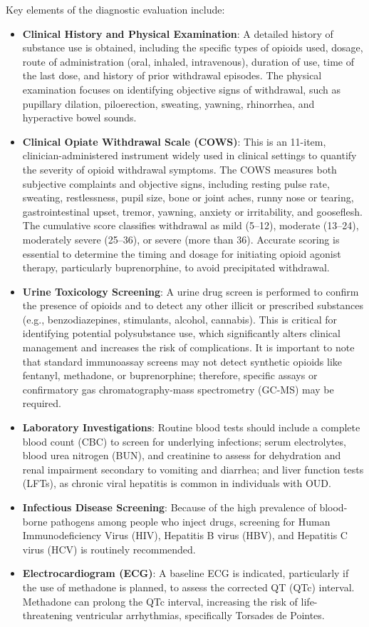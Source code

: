 Key elements of the diagnostic evaluation include:
\begin{itemize}
    \item \textbf{Clinical History and Physical Examination}: A detailed history of substance use is obtained, including the specific types of opioids used, dosage, route of administration (oral, inhaled, intravenous), duration of use, time of the last dose, and history of prior withdrawal episodes. The physical examination focuses on identifying objective signs of withdrawal, such as pupillary dilation, piloerection, sweating, yawning, rhinorrhea, and hyperactive bowel sounds.
    \item \textbf{Clinical Opiate Withdrawal Scale (COWS)}: This is an 11-item, clinician-administered instrument widely used in clinical settings to quantify the severity of opioid withdrawal symptoms. The COWS measures both subjective complaints and objective signs, including resting pulse rate, sweating, restlessness, pupil size, bone or joint aches, runny nose or tearing, gastrointestinal upset, tremor, yawning, anxiety or irritability, and gooseflesh. The cumulative score classifies withdrawal as mild (5–12), moderate (13–24), moderately severe (25–36), or severe (more than 36). Accurate scoring is essential to determine the timing and dosage for initiating opioid agonist therapy, particularly buprenorphine, to avoid precipitated withdrawal.
    \item \textbf{Urine Toxicology Screening}: A urine drug screen is performed to confirm the presence of opioids and to detect any other illicit or prescribed substances (e.g., benzodiazepines, stimulants, alcohol, cannabis). This is critical for identifying potential polysubstance use, which significantly alters clinical management and increases the risk of complications. It is important to note that standard immunoassay screens may not detect synthetic opioids like fentanyl, methadone, or buprenorphine; therefore, specific assays or confirmatory gas chromatography-mass spectrometry (GC-MS) may be required.
    \item \textbf{Laboratory Investigations}: Routine blood tests should include a complete blood count (CBC) to screen for underlying infections; serum electrolytes, blood urea nitrogen (BUN), and creatinine to assess for dehydration and renal impairment secondary to vomiting and diarrhea; and liver function tests (LFTs), as chronic viral hepatitis is common in individuals with OUD.
    \item \textbf{Infectious Disease Screening}: Because of the high prevalence of blood-borne pathogens among people who inject drugs, screening for Human Immunodeficiency Virus (HIV), Hepatitis B virus (HBV), and Hepatitis C virus (HCV) is routinely recommended.
    \item \textbf{Electrocardiogram (ECG)}: A baseline ECG is indicated, particularly if the use of methadone is planned, to assess the corrected QT (QTc) interval. Methadone can prolong the QTc interval, increasing the risk of life-threatening ventricular arrhythmias, specifically Torsades de Pointes.
\end{itemize}

